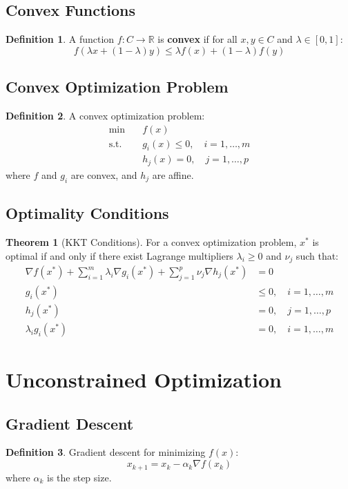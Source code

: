 \documentclass[11pt]{article}
\theoremstyle{definition}
\newtheorem{definition}{Definition}[section]
\newtheorem{theorem}{Theorem}[section]
\begin{document}
\subsection{Convex Functions}
\begin{definition}
A function $f: C \to \mathbb{R}$ is \textbf{convex} if for all $x, y \in C$ and $\lambda \in [0,1]$:
$$f(\lambda x + (1-\lambda) y) \leq \lambda f(x) + (1-\lambda) f(y)$$
\end{definition}

\subsection{Convex Optimization Problem}
\begin{definition}
A convex optimization problem:
\begin{align}
\min \quad & f(x) \\
\text{s.t.} \quad & g_i(x) \leq 0, \quad i = 1, \ldots, m \\
& h_j(x) = 0, \quad j = 1, \ldots, p
\end{align}
where $f$ and $g_i$ are convex, and $h_j$ are affine.
\end{definition}

\subsection{Optimality Conditions}
\begin{theorem}[KKT Conditions]
For a convex optimization problem, $x^*$ is optimal if and only if there exist Lagrange multipliers $\lambda_i \geq 0$ and $\nu_j$ such that:
\begin{align}
\nabla f(x^*) + \sum_{i=1}^m \lambda_i \nabla g_i(x^*) + \sum_{j=1}^p \nu_j \nabla h_j(x^*) &= 0 \\
g_i(x^*) &\leq 0, \quad i = 1, \ldots, m \\
h_j(x^*) &= 0, \quad j = 1, \ldots, p \\
\lambda_i g_i(x^*) &= 0, \quad i = 1, \ldots, m
\end{align}
\end{theorem}

\section{Unconstrained Optimization}

\subsection{Gradient Descent}
\begin{definition}
Gradient descent for minimizing $f(x)$:
$$x_{k+1} = x_k - \alpha_k \nabla f(x_k)$$
where $\alpha_k$ is the step size.
\end{definition}
\end{document}
